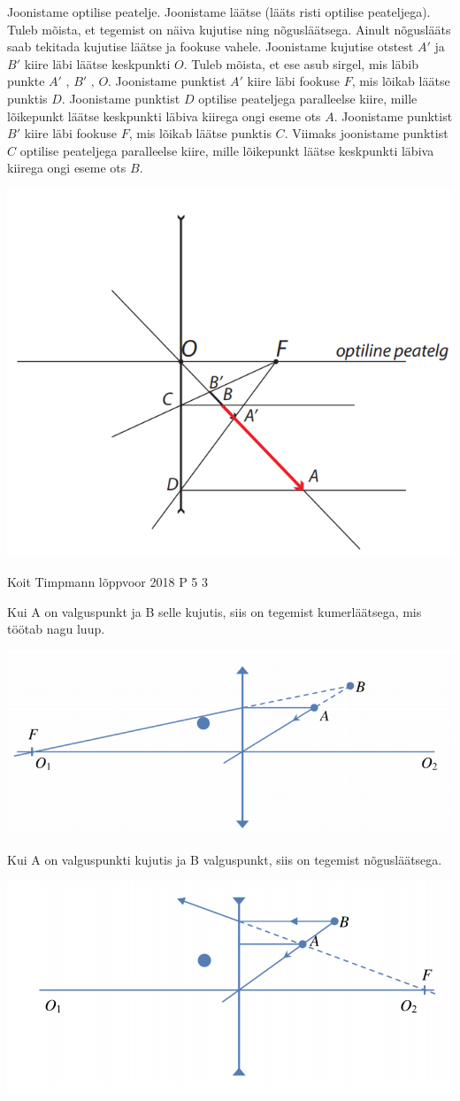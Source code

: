 \documentclass[11pt]{article}
\begin{document}
{{\ifSolution
Joonistame optilise peatelje. Joonistame läätse (lääts risti optilise peateljega). Tuleb mõista, et tegemist on näiva kujutise ning nõgusläätsega. Ainult nõguslääts saab tekitada kujutise läätse ja fookuse vahele. Joonistame kujutise otstest $A'$ ja $B'$ kiire läbi läätse keskpunkti $O$. Tuleb mõista, et ese asub sirgel, mis läbib punkte $A'$ , $B'$ , $O$. Joonistame punktist $A'$ kiire läbi fookuse $F$, mis lõikab läätse punktis $D$. Joonistame punktist $D$ optilise peateljega paralleelse kiire, mille lõikepunkt läätse keskpunkti läbiva kiirega ongi eseme ots $A$. Joonistame punktist $B'$ kiire läbi fookuse $F$, mis lõikab läätse punktis $C$. Viimaks joonistame punktist $C$ optilise peateljega paralleelse kiire, mille lõikepunkt läätse keskpunkti läbiva kiirega ongi eseme ots $B$.
\begin{center}
	\includegraphics[width=0.5\linewidth]{2018-v2p-10-lah.PNG}
\end{center}
\fi
}


{Koit Timpmann} %
{lõppvoor} %
{2018} %
{P 5} %
{3} %
{

\ifSolution
Kui A on valguspunkt ja B selle kujutis, siis on tegemist kumerläätsega, mis töötab nagu luup.
\begin{center}
	\includegraphics[width=0.5\linewidth]{2018-v3p-05-lah1.PNG}
\end{center}
Kui A on valguspunkti kujutis ja B valguspunkt, siis on tegemist nõgusläätsega.
\begin{center}
	\includegraphics[width=0.5\linewidth]{2018-v3p-05-lah2.PNG}
\end{center}
\fi
}

}
\end{document}

